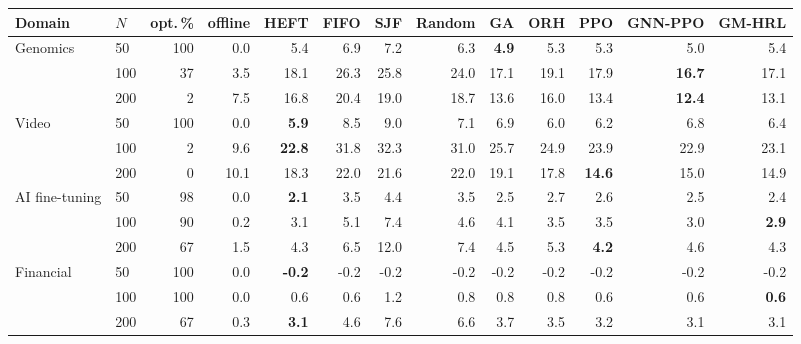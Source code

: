 \begin{tabular}{llrrrrrrrrrrr}
\toprule
Domain & $N$ & opt.\,\% & offline & HEFT & FIFO & SJF & Random & GA & ORH & PPO & GNN-PPO & GM-HRL \\
\midrule
Genomics & 50 & 100 & 0.0 & 5.4 & 6.9 & 7.2 & 6.3 & \textbf{4.9} & 5.3 & 5.3 & 5.0 & 5.4 \\
 & 100 & 37 & 3.5 & 18.1 & 26.3 & 25.8 & 24.0 & 17.1 & 19.1 & 17.9 & \textbf{16.7} & 17.1 \\
 & 200 & 2 & 7.5 & 16.8 & 20.4 & 19.0 & 18.7 & 13.6 & 16.0 & 13.4 & \textbf{12.4} & 13.1 \\
Video & 50 & 100 & 0.0 & \textbf{5.9} & 8.5 & 9.0 & 7.1 & 6.9 & 6.0 & 6.2 & 6.8 & 6.4 \\
 & 100 & 2 & 9.6 & \textbf{22.8} & 31.8 & 32.3 & 31.0 & 25.7 & 24.9 & 23.9 & 22.9 & 23.1 \\
 & 200 & 0 & 10.1 & 18.3 & 22.0 & 21.6 & 22.0 & 19.1 & 17.8 & \textbf{14.6} & 15.0 & 14.9 \\
AI fine-tuning & 50 & 98 & 0.0 & \textbf{2.1} & 3.5 & 4.4 & 3.5 & 2.5 & 2.7 & 2.6 & 2.5 & 2.4 \\
 & 100 & 90 & 0.2 & 3.1 & 5.1 & 7.4 & 4.6 & 4.1 & 3.5 & 3.5 & 3.0 & \textbf{2.9} \\
 & 200 & 67 & 1.5 & 4.3 & 6.5 & 12.0 & 7.4 & 4.5 & 5.3 & \textbf{4.2} & 4.6 & 4.3 \\
Financial & 50 & 100 & 0.0 & \textbf{-0.2} & -0.2 & -0.2 & -0.2 & -0.2 & -0.2 & -0.2 & -0.2 & -0.2 \\
 & 100 & 100 & 0.0 & 0.6 & 0.6 & 1.2 & 0.8 & 0.8 & 0.8 & 0.6 & 0.6 & \textbf{0.6} \\
 & 200 & 67 & 0.3 & \textbf{3.1} & 4.6 & 7.6 & 6.6 & 3.7 & 3.5 & 3.2 & 3.1 & 3.1 \\
\bottomrule
\end{tabular}
